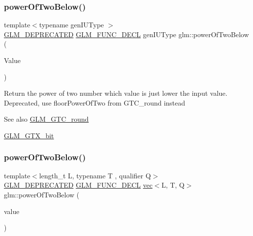 \subsubsection{\texorpdfstring{power\+Of\+Two\+Below()}{powerOfTwoBelow()}\hspace{0.1cm}{\footnotesize\ttfamily [1/2]}}
{\footnotesize\ttfamily template$<$typename gen\+I\+U\+Type $>$ \\
\hyperlink{setup_8hpp_a8edfb48cdc249a3ee48406bf179023dc}{G\+L\+M\+\_\+\+D\+E\+P\+R\+E\+C\+A\+T\+ED} \hyperlink{setup_8hpp_ab2d052de21a70539923e9bcbf6e83a51}{G\+L\+M\+\_\+\+F\+U\+N\+C\+\_\+\+D\+E\+CL} gen\+I\+U\+Type glm\+::power\+Of\+Two\+Below (\begin{DoxyParamCaption}\item[{gen\+I\+U\+Type}]{Value }\end{DoxyParamCaption})}

Return the power of two number which value is just lower the input value. Deprecated, use floor\+Power\+Of\+Two from G\+T\+C\+\_\+round instead

\begin{DoxySeeAlso}{See also}
\hyperlink{group__gtc__round}{G\+L\+M\+\_\+\+G\+T\+C\+\_\+round} 

\hyperlink{group__gtx__bit}{G\+L\+M\+\_\+\+G\+T\+X\+\_\+bit} 
\end{DoxySeeAlso}
\mbox{\label{group__gtx__bit_gaf78ddcc4152c051b2a21e68fecb10980}} 
\subsubsection{\texorpdfstring{power\+Of\+Two\+Below()}{powerOfTwoBelow()}\hspace{0.1cm}{\footnotesize\ttfamily [2/2]}}
{\footnotesize\ttfamily template$<$length\+\_\+t L, typename T , qualifier Q$>$ \\
\hyperlink{setup_8hpp_a8edfb48cdc249a3ee48406bf179023dc}{G\+L\+M\+\_\+\+D\+E\+P\+R\+E\+C\+A\+T\+ED} \hyperlink{setup_8hpp_ab2d052de21a70539923e9bcbf6e83a51}{G\+L\+M\+\_\+\+F\+U\+N\+C\+\_\+\+D\+E\+CL} \hyperlink{structglm_1_1vec}{vec}$<$L, T, Q$>$ glm\+::power\+Of\+Two\+Below (\begin{DoxyParamCaption}\item[{\hyperlink{structglm_1_1vec}{vec}$<$ L, T, Q $>$ const \&}]{value }\end{DoxyParamCaption})}

